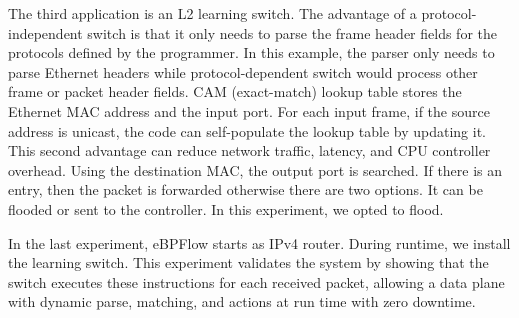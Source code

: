 

The third application is an L2 learning switch. The advantage of a protocol-independent switch is that it only needs to parse the frame header fields for the protocols defined by the programmer. In this example, the parser only needs to parse Ethernet headers while protocol-dependent switch would process other frame or packet header fields. CAM (exact-match) lookup table stores the Ethernet MAC address and the input port. 
For each input frame, if the source address is unicast, the code can self-populate the lookup table by updating it. This second advantage can reduce network traffic, latency, and CPU controller overhead. Using the destination MAC, the output port is searched. If there is an entry, then the packet is forwarded otherwise there are two options. It can be flooded or sent to the controller. In this experiment, we opted to flood.


In the last experiment, eBPFlow starts as IPv4 router. During runtime, we install the learning switch. This experiment validates the system by showing that the switch executes these instructions for each received packet, allowing a data plane with dynamic parse, matching, and actions at run time with zero downtime.

